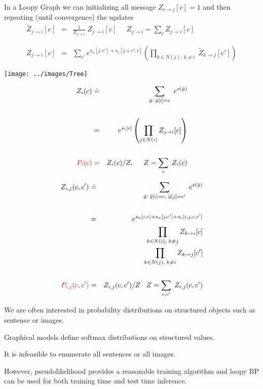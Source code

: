 {

In a Loopy Graph we can initializing all message $Z_{i \rightarrow j}[c] = 1$ and then repeating (until convergence) the updates
\vfill
\begin{eqnarray*}
  \tilde{Z}_{j \rightarrow i}[c] & = & \frac{1}{Z_{j \rightarrow i}}\;Z_{j \rightarrow i}[c] \;\;\;\;\;Z_{j \rightarrow i} = \sum_{c} Z_{j \rightarrow i}[c] \\
  \\
  \\
  Z_{j\rightarrow i}[c] & = & \sum_{c'}  e^{s_n[j,c'] + s_e[j,i,c',c]}
    \left(\prod_{k \in N(j),\;k \not = i}\;\tilde{Z}_{k\rightarrow j}[c']\right)
\end{eqnarray*}


\centerline{\texttt{[image: ../images/Tree]}}

\begin{eqnarray*}
Z_i(c) & \doteq & \sum_{\hat{y}:\; \hat{y}[i] = c} \;e^{s(\hat{y})} \\
\\
& = & e^{s_i[c]} \left(\prod_{j\in N(i)} Z_{j \rightarrow i}[c]\right) \\
\\
{\color{red} P_i(c)} & = & Z_i(c)/Z,\;\;\;\;\; Z = \sum_{c}\;Z_i(c)
\end{eqnarray*}



\begin{eqnarray*}
Z_{i,j}(c,c') & \doteq & \sum_{\hat{y}:\; \hat{y}[i] = c,\;\hat{y}[j] = c'} \;e^{s(\hat{y})} \\
\\
& = & e^{s_n[i,c] + s_n[j,c'] +s_e[i,j,c,c']} \\
& & \prod_{k\in N(i),\;k \not = j} Z_{k \rightarrow i}[c] \\
& & \prod_{k\in N(j),\;k \not = i} Z_{k \rightarrow j}[c'] \\
\\
{\color{red} P_{i,j}(c,c')} & = & Z_{i,j}(c,c')/Z\;\;\;Z = \sum_{c,c'}\;Z_{i,j}(c,c')
\end{eqnarray*}



We are often interested in probability distributions on structured objects such as sentence or images.

\vfill
Graphical models define softmax distributions on structured values.

\vfill
It is infeasible to enumerate all sentences or all images.

\vfill
However, pseudolikelihood provides a reasonable training algorithm and loopy BP can be used for both training time and test time
inference.


}



